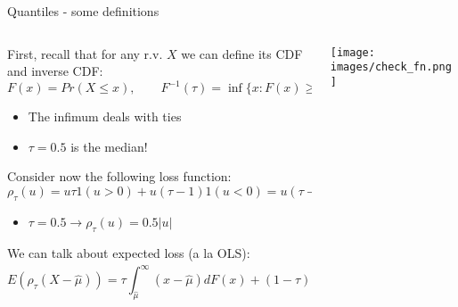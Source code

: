 \documentclass[notes,11pt, aspectratio=169]{beamer}
\newenvironment{wideitemize}{\itemize\addtolength{\itemsep}{10pt}}{\enditemize}
\begin{document}
\begin{frame}{Quantiles - some definitions}
  \begin{columns}[T] %
\begin{column}{.7\textwidth}
  \begin{wideitemize}
  \item First, recall that for any r.v. $X$ we can define its CDF and inverse CDF:
    $$F(x) = Pr(X \leq x), \qquad F^{-1}(\tau) = \inf\{x : F(x) \geq \tau\}$$
    \begin{itemize}
    \vspace{-15pt}      
    \item The infimum deals with ties
    \item $\tau = 0.5$ is the median!
    \end{itemize}
  \item Consider now the following loss function:
    $$ \rho_{\tau}(u) = u \tau 1(u > 0) + u(\tau-1) 1(u <0) = u(\tau - 1(u<0))$$
    \vspace{-15pt}
    \begin{itemize}
    \item $\tau = 0.5 \longrightarrow \rho_{\tau}(u) = 0.5|u|$
    \end{itemize}
  \item We can talk about expected loss (a la  OLS):
    $$ E(\rho_\tau(X - \hat{\mu})) = \tau \int_{\hat{\mu}}^{\infty} (x - \hat{\mu}) dF(x) + (1-\tau) \int^{\hat{\mu}}_{-\infty} (x - \hat{\mu}) dF(x)$$
  \end{wideitemize}
  \end{column}%
  \hfill%
  \begin{column}{.3\textwidth}
    \texttt{[image: images/check\_fn.png]}
  \end{column}
\end{columns}
\end{frame}
\end{document}
